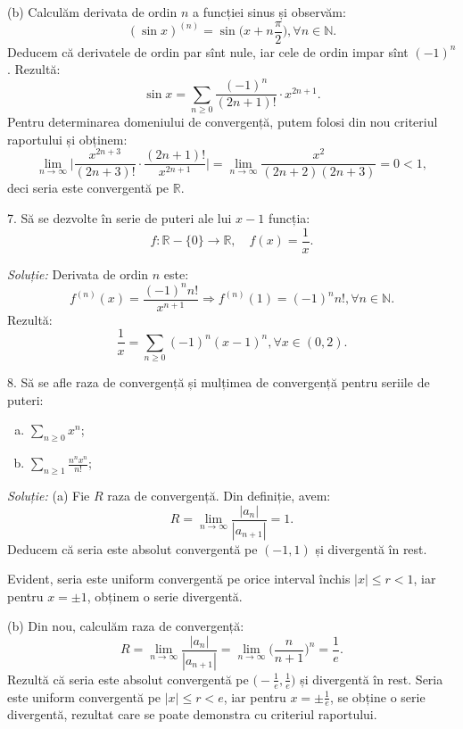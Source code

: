 \documentclass[11pt,a4paper]{article}
\newcommand\ds{\displaystyle}
\newcommand\NN{\mathbb{N}}
\newcommand\RR{\mathbb{R}}
\theoremstyle{dotless}
\theoremstyle{dotlessdr}
\begin{document}
(b) Calculăm derivata de ordin $n$ a funcției sinus și observăm:
\[
  (\sin x)^{(n)} = \sin \Big( x + n \frac{\pi}{2} \Big), \forall n \in \NN.
\]
Deducem că derivatele de ordin par sînt nule, iar cele de ordin impar sînt $(-1)^n$.
Rezultă:
\[
  \sin x = \sum_{n \geq 0} \frac{(-1)^n}{(2n + 1)!} \cdot x^{2n + 1}.
\]
Pentru determinarea domeniului de convergență, putem folosi din nou criteriul
raportului și obținem:
\[
  \lim_{n \to \infty} \Big| \frac{x^{2n + 3}}{(2n + 3)!} \cdot \frac{(2n + 1)!}{x^{2n + 1}} \Big| = %
  \lim_{n \to \infty} \frac{x^2}{(2n + 2)(2n + 3)} = 0 < 1,
\]
deci seria este convergentă pe $\RR$.

\vspace{1cm}

7. Să se dezvolte în serie de puteri ale lui $x - 1$ funcția:
\[
  f : \RR - \{ 0 \} \to \RR, \quad f(x) = \frac{1}{x}.
\]

\emph{Soluție:} Derivata de ordin $n$ este:
\[
  f^{(n)}(x) = \frac{(-1)^n n!}{x^{n+1}} \Rightarrow f^{(n)}(1) = (-1)^n n!, \forall n \in \NN.
\]
Rezultă:
\[
  \frac{1}{x} = \sum_{n \geq 0} (-1)^n (x - 1)^n, \forall x \in (0, 2).
\]

\vspace{1cm}

8. Să se afle raza de convergență și mulțimea de convergență pentru seriile de puteri:
\begin{enumerate}[(a)]
\item $\ds\sum_{n \geq 0} x^n$;
\item $\ds\sum_{n \geq 1} \frac{n^n x^n}{n!}$;
\end{enumerate}

\emph{Soluție:} (a) Fie $R$ raza de convergență. Din definiție, avem:
\[
  R = \lim_{n \to \infty} \frac{|a_n|}{|a_{n + 1}|} = 1.
\]
Deducem că seria este absolut convergentă pe $(-1, 1)$ și divergentă în rest.

Evident, seria este uniform convergentă pe orice interval închis $|x| \leq r < 1$, iar
pentru $x = \pm 1$, obținem o serie divergentă.

(b) Din nou, calculăm raza de convergență:
\[
  R = \lim_{n \to \infty} \frac{|a_n|}{|a_{n + 1}|} = %
  \lim_{n \to \infty} \Big( \frac{n}{n + 1} \Big)^n = \frac{1}{e}.
\]
Rezultă că seria este absolut convergentă pe $\Big( -\frac{1}{e}, \frac{1}{e} \Big)$
și divergentă în rest. Seria este uniform convergentă pe $|x| \leq r < e$, iar
pentru $x = \pm \frac{1}{e}$, se obține o serie divergentă, rezultat care
se poate demonstra cu criteriul raportului.
\end{document}
